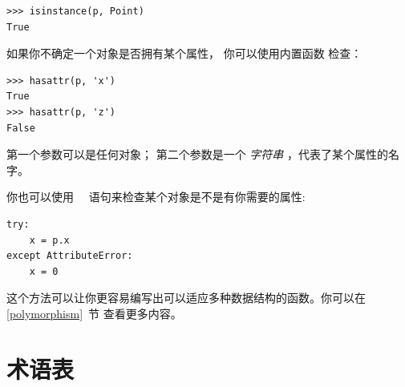 \begin{lstlisting}
>>> isinstance(p, Point)
True
\end{lstlisting}

%

如果你不确定一个对象是否拥有某个属性， 你可以使用内置函数  检查：
  

\begin{lstlisting}
>>> hasattr(p, 'x')
True
>>> hasattr(p, 'z')
False
\end{lstlisting}

%

第一个参数可以是任何对象；
第二个参数是一个 {\em 字符串} ，代表了某个属性的名字。



你也可以使用 　语句来检查某个对象是不是有你需要的属性:

  

\begin{lstlisting}
try:
    x = p.x
except AttributeError:
    x = 0
\end{lstlisting}


这个方法可以让你更容易编写出可以适应多种数据结构的函数。你可以在 \ref{polymorphism}~节 查看更多内容。


\section{术语表}


